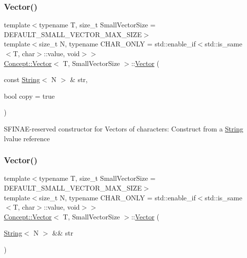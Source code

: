 \subsubsection{\texorpdfstring{Vector()}{Vector()}\hspace{0.1cm}{\footnotesize\ttfamily [6/7]}}
{\footnotesize\ttfamily template$<$typename T, size\+\_\+t Small\+Vector\+Size = D\+E\+F\+A\+U\+L\+T\+\_\+\+S\+M\+A\+L\+L\+\_\+\+V\+E\+C\+T\+O\+R\+\_\+\+M\+A\+X\+\_\+\+S\+I\+ZE$>$ \\
template$<$size\+\_\+t N, typename C\+H\+A\+R\+\_\+\+O\+N\+LY  = std\+::enable\+\_\+if$<$std\+::is\+\_\+same$<$\+T, char$>$\+::value, void$>$$>$ \\
\mbox{\hyperlink{class_concept_1_1_vector}{Concept\+::\+Vector}}$<$ T, Small\+Vector\+Size $>$\+::\mbox{\hyperlink{class_concept_1_1_vector}{Vector}} (\begin{DoxyParamCaption}\item[{const \mbox{\hyperlink{class_concept_1_1_string}{String}}$<$ N $>$ \&}]{str,  }\item[{bool}]{copy = {\ttfamily true} }\end{DoxyParamCaption})\hspace{0.3cm}{\ttfamily [inline]}}

S\+F\+I\+N\+A\+E-\/reserved constructor for Vectors of characters\+: Construct from a \mbox{\hyperlink{class_concept_1_1_string}{String}} lvalue reference \mbox{\label{class_concept_1_1_vector_a69f43693d96addb57df7226512891c01}} 
\subsubsection{\texorpdfstring{Vector()}{Vector()}\hspace{0.1cm}{\footnotesize\ttfamily [7/7]}}
{\footnotesize\ttfamily template$<$typename T, size\+\_\+t Small\+Vector\+Size = D\+E\+F\+A\+U\+L\+T\+\_\+\+S\+M\+A\+L\+L\+\_\+\+V\+E\+C\+T\+O\+R\+\_\+\+M\+A\+X\+\_\+\+S\+I\+ZE$>$ \\
template$<$size\+\_\+t N, typename C\+H\+A\+R\+\_\+\+O\+N\+LY  = std\+::enable\+\_\+if$<$std\+::is\+\_\+same$<$\+T, char$>$\+::value, void$>$$>$ \\
\mbox{\hyperlink{class_concept_1_1_vector}{Concept\+::\+Vector}}$<$ T, Small\+Vector\+Size $>$\+::\mbox{\hyperlink{class_concept_1_1_vector}{Vector}} (\begin{DoxyParamCaption}\item[{\mbox{\hyperlink{class_concept_1_1_string}{String}}$<$ N $>$ \&\&}]{str }\end{DoxyParamCaption})\hspace{0.3cm}{\ttfamily [inline]}}

